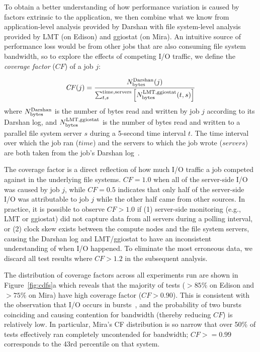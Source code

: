 \documentclass[conference,10pt,compsocconf]{IEEEtran}
\begin{document}
To obtain a better understanding of how performance variation is caused by factors extrinsic to the application, we then combine what we know from application-level analysis provided by Darshan with file system-level analysis provided by LMT (on Edison) and ggiostat (on Mira).  An intuitive source of performance loss would be from other jobs that are also consuming file system bandwidth, so to explore the effects of competing I/O traffic, we define the \emph{coverage factor} ($\mathit{CF}$) of a job $j$:

\begin{equation} \label{eq:cf}
    \mathit{CF}(j) = \frac{N_{\textup{bytes}}^{\textup{Darshan}}(j)}
    {\sum_{t,s}^{\textup{time,servers}}
    \left [ N_{\textup{bytes}}^{\textup{LMT,ggiostat}}(t,s) \right ] }
\end{equation}
%
where $N_{\textup{bytes}}^{\textup{Darshan}}$ is the number of bytes read and written by job $j$ according to its Darshan log, and $N_{\textup{bytes}}^{\textup{LMT,ggiostat}}$ is the number of bytes read and written to a parallel file system server $s$ during a 5-second time interval $t$.
The time interval over which the job ran ($\mathit{time}$) and the servers to which the job wrote ($\mathit{servers}$) are both taken from the job's Darshan log~\cite{snyder2016modular}.

The coverage factor is a direct reflection of how much I/O traffic a job
competed against in the underlying file systems.  $CF = 1.0$ when
all of the server-side I/O was caused by job $j$, while $CF = 0.5$ indicates that only half of the server-side I/O was attributable to job $j$ while the other half came from other sources.
In practice, it is possible to observe $CF > 1.0$ 
if (1) server-side monitoring (e.g., LMT or ggiostat)
did not capture data from all servers during a polling interval, or (2) clock skew exists between the compute nodes and the file system servers, causing the Darshan log and LMT/ggiostat to have an inconsistent understanding of when I/O happened.
To eliminate the most erroneous data, we discard all test results where $CF > 1.2$ in the subsequent analysis.

The distribution of coverage factors across all experiments run are shown in
Figure~\ref{fig:cdfs}a which reveals that the majority of tests
($> 85\%$ on Edison and $> 75\%$ on Mira) have high coverage factor
($CF > 0.90$).  This is consistent with the observation that I/O occurs in
bursts~\cite{Carns2011,Liu2016}, and the probability of two bursts coinciding
and causing contention for bandwidth (thereby reducing $CF$) is relatively low.
In particular, Mira's CF distribution is so narrow that over 50\% of tests effectively ran completely uncontended for bandwidth; $\textit{CF} >= 0.99$ corresponds to the 43rd percentile on that system.
\end{document}
